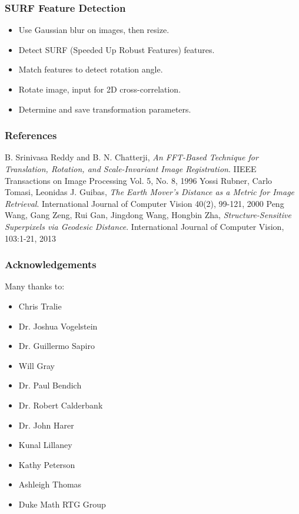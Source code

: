 \documentclass{beamer}
\begin{document}
\begin{frame}
\frametitle{SURF Feature Detection}
\begin{itemize}
\item Use Gaussian blur on images, then resize.
\item Detect SURF (Speeded Up Robust Features) features. 
\item Match features to detect rotation angle. 
\item Rotate image, input for 2D cross-correlation.
\item Determine and save transformation parameters. 
\end{itemize}
\end{frame}

\begin{frame}
\frametitle{References}
\begin{thebibliography}{9}
	B. Srinivasa Reddy and B. N. Chatterji,
	\emph{An FFT-Based Technique for Translation, Rotation, and Scale-Invariant Image Registration}.
	IIEEE Transactions on Image Processing Vol. 5, No. 8, 1996
	Yossi Rubner, Carlo Tomasi, Leonidas J. Guibas,
	\emph{The Earth Mover's Distance as a Metric for Image Retrieval}.
	International Journal of Computer Vision 40(2), 99-121, 2000
	Peng Wang, Gang Zeng, Rui Gan, Jingdong Wang, Hongbin Zha,
	\emph{Structure-Sensitive Superpixels via Geodesic Distance}.
	International Journal of Computer Vision, 103:1-21, 2013
\end{thebibliography} 
\end{frame}

\begin{frame}
\frametitle{Acknowledgements}
Many thanks to:
\begin{itemize}
\item Chris Tralie
\item Dr. Joshua Vogelstein
\item Dr. Guillermo Sapiro
\item Will Gray 
\item Dr. Paul Bendich 
\item Dr. Robert Calderbank
\item Dr. John Harer
\item Kunal Lillaney
\item Kathy Peterson 
\item Ashleigh Thomas 
\item Duke Math RTG Group 
\end{itemize}
\end{frame}
\end{document}
